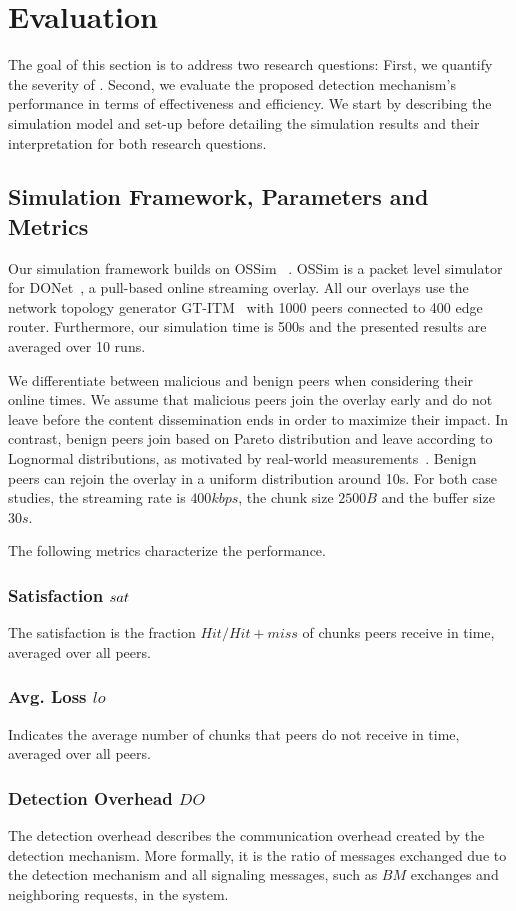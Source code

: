 \section{Evaluation}
\label{sec:eval}

The goal of this section is to address two research questions: 
First, we quantify the severity of \drop. 
Second, we evaluate the proposed detection mechanism's performance in terms of effectiveness and efficiency. 
We start by describing the simulation model and set-up before detailing the simulation results and their interpretation for both research questions.


\subsection{Simulation Framework, Parameters and Metrics}
Our simulation framework builds on OSSim ~\cite{nguyen2013ossim}. 
OSSim is a packet level simulator for DONet~\cite{zhang2005coolstreaming}, a pull-based online streaming overlay.
All our overlays use the network topology generator GT-ITM~\cite{GT} with 1000 peers connected to 400 edge router. Furthermore, our simulation time is 500s and the presented results are averaged over 10 runs. 

We differentiate between malicious and benign peers when considering their online times. 
We assume that malicious peers join the overlay early and do not leave before the content dissemination ends in order to maximize their impact. 
In contrast,  benign peers join based on Pareto distribution and leave according to Lognormal distributions, as motivated by real-world measurements~\cite{distribution}.
Benign peers can rejoin the overlay in a uniform distribution around 10s. For both case studies, the streaming rate is $400kbps$, the chunk size $2500B$ and the buffer size $30s$.


The following metrics characterize the performance.
\subsubsection*{Satisfaction $sat$} The satisfaction is the fraction $Hit/Hit+miss$ of chunks peers receive in time, averaged over all peers. 
\subsubsection*{Avg. Loss $lo$} Indicates the average number of chunks that peers do not receive in time, averaged over all peers. 
\subsubsection*{Detection Overhead $DO$} The detection overhead describes the communication overhead created by the detection mechanism. 
More formally, it is the ratio of messages exchanged due to the detection mechanism and all signaling messages, such as $BM$ exchanges and neighboring requests, in the system.
